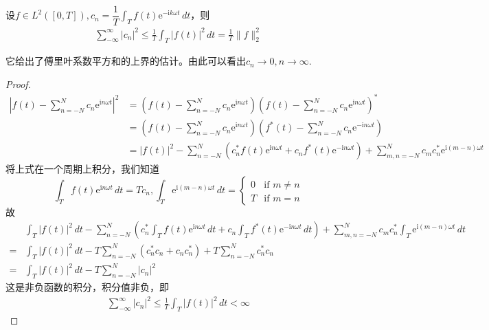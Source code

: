 \documentclass{ctexbook}
\begin{document}
\begin{lemma}[贝塞尔不等式]
设$ f\in L^2([0,T]),c_n=\dfrac{1}{T}\int_{T}f(t)\mathrm{e}^{-\mathrm{i}k\omega t}\,dt$，则
\begin{align*}
    \sum_{-\infty}^{\infty}|c_n|^2\leq \frac{1}{T}\int_{T}|f(t)|^2\,dt=\frac{1}{T}\|f\|_2^2
\end{align*}
\end{lemma}
它给出了傅里叶系数平方和的上界的估计。由此可以看出$c_n\to 0,n\to\infty$.
\begin{proof}
    \begin{align*}
    \left|f(t)-\sum_{n=-N}^{N}c_n \mathrm{e}^{\mathrm{i}n\omega t}\right|^2 & =\left(f(t)-\sum_{n=-N}^{N}c_n \mathrm{e}^{\mathrm{i}n\omega t}\right)\left(f(t)-\sum_{n=-N}^{N}c_n \mathrm{e}^{\mathrm{i}n\omega t}\right)^*\\
    & =\left(f(t)-\sum_{n=-N}^{N}c_n \mathrm{e}^{\mathrm{i}n\omega t}\right)\left(f^*(t)-\sum_{n=-N}^{N}c_n \mathrm{e}^{-\mathrm{i}n\omega t}\right)\\
    & =|f(t)|^2-\sum_{n=-N}^{N}\left(c_n^*f(t)\mathrm{e}^{\mathrm{i}n\omega t}+c_n f^*(t)\mathrm{e}^{-\mathrm{i}n\omega t}\right)+\sum_{m,n=-N}^{N}c_m c_n^*\mathrm{e}^{\mathrm{i}(m-n)\omega t}
\end{align*}
将上式在一个周期上积分，我们知道
\[\int_{T}f(t)\mathrm{e}^{\mathrm{i}n\omega t}\,dt=Tc_n,\int_{T}\mathrm{e}^{\mathrm{i}(m-n)\omega t}\,dt=\begin{cases}
        0 & \text{if }m\neq n \\
        T & \text{if }m=n
    \end{cases}\]
故\begin{align*}
      & \int_{T}|f(t)|^2\,dt-\sum_{n=-N}^{N}\left(c_n^*\int_{T}f(t)\mathrm{e}^{\mathrm{i}n\omega t}\,dt+c_n \int_{T}f^*(t)\mathrm{e}^{-\mathrm{i}n\omega t}\,dt\right)+\sum_{m,n=-N}^{N}c_m c_n^*\int_{T}\mathrm{e}^{\mathrm{i}(m-n)\omega t}\,dt \\
    = & \int_{T}|f(t)|^2\,dt-T\sum_{n=-N}^{N}(c_n^* c_n+c_n c_n^*)+T\sum_{n=-N}^{N}c_n^* c_n\\
    = & \int_{T}|f(t)|^2\,dt-T\sum_{n=-N}^{N}|c_n|^2
\end{align*}
这是非负函数的积分，积分值非负，即\begin{align*}
    \sum_{-\infty}^{\infty}|c_n|^2\leq \frac{1}{T}\int_{T}|f(t)|^2\,dt<\infty
\end{align*}
\end{proof}
\end{document}
